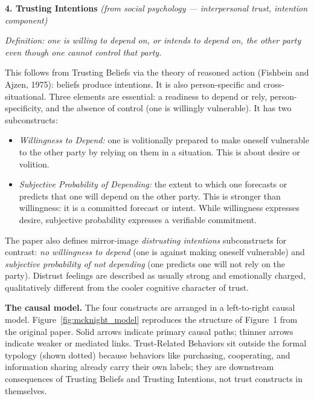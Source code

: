 \documentclass[11pt, a4paper]{article}
\begin{document}
\medskip
\noindent\textbf{4. Trusting Intentions} \quad \textit{(from social psychology --- interpersonal trust, intention component)}

\medskip
\noindent\textit{Definition: one is willing to depend on, or intends to depend on, the other party even though one cannot control that party.}

This follows from Trusting Beliefs via the theory of reasoned action (Fishbein and Ajzen, 1975): beliefs produce intentions. It is also person-specific and cross-situational. Three elements are essential: a readiness to depend or rely, person-specificity, and the absence of control (one is willingly vulnerable). It has two subconstructs:

\begin{itemize}
  \item \textit{Willingness to Depend:} one is volitionally prepared to make oneself vulnerable to the other party by relying on them in a situation. This is about desire or volition.
  \item \textit{Subjective Probability of Depending:} the extent to which one forecasts or predicts that one will depend on the other party. This is stronger than willingness: it is a committed forecast or intent. While willingness expresses desire, subjective probability expresses a verifiable commitment.
\end{itemize}

The paper also defines mirror-image \textit{distrusting intentions} subconstructs for contrast: \textit{no willingness to depend} (one is against making oneself vulnerable) and \textit{subjective probability of not depending} (one predicts one will not rely on the party). Distrust feelings are described as usually strong and emotionally charged, qualitatively different from the cooler cognitive character of trust.

\medskip
\noindent\textbf{The causal model.} The four constructs are arranged in a left-to-right causal model. Figure~\ref{fig:mcknight_model} reproduces the structure of Figure~1 from the original paper. Solid arrows indicate primary causal paths; thinner arrows indicate weaker or mediated links. Trust-Related Behaviors sit outside the formal typology (shown dotted) because behaviors like purchasing, cooperating, and information sharing already carry their own labels; they are downstream consequences of Trusting Beliefs and Trusting Intentions, not trust constructs in themselves.
\end{document}
